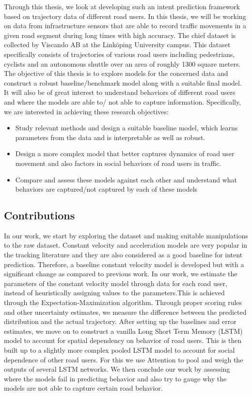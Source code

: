 \documentclass{article}
\begin{document}
Through this thesis, we look at developing such an intent prediction framework based on trajectory data of different road users. In this thesis, we will be working on data from infrastructure sensors that are able to record traffic movements in a given road segment during long times with high accuracy. The chief dataset is collected by Viscando AB at the Linköping University campus. This dataset specifically consists of trajectories of various road users including pedestrians, cyclists and an autonomous shuttle over an area of roughly 1300 square meters. The objective of this thesis is to explore models for the concerned data and construct a robust baseline/benchmark model along with a suitable final model. It will also be of great interest to understand behaviors of different road users and where the models are able to/ not able to capture information. Specifically, we are interested in achieving these research objectives:
\begin{itemize}
    \item Study relevant methods and design a suitable baseline model, which learns parameters from the data and is interpretable as well as robust. 
    \item Design a more complex model that better captures dynamics of road user movement and also factors in social behaviors of road users in traffic. 
    \item Compare and assess these models against each other and understand what behaviors are captured/not captured by each of these models
\end{itemize}


\subsection{Contributions}
In our work, we start by exploring the dataset and making suitable manipulations to the raw dataset. Constant velocity\cite{cvmodel} and acceleration models are very popular in the tracking literature and they are also considered as a good baseline for intent prediction. Therefore, a baseline constant velocity model is developed but with a significant change as compared to previous work. In our work, we estimate the parameters of the constant velocity model through data for each road user, instead of heuristically assigning values to the parameters.This is achieved through the Expectation-Maximization algorithm\cite{emalgorithm}. Through proper scoring rules \cite{scoring} and other uncertainty estimates, we  measure the difference between the predicted distribution and the actual trajectory.  After setting up the baselines and error estimates, we move on to construct a vanilla Long Short Term Memory (LSTM) model to account for spatial dependency on behavior of road users. This is then built up to a slightly more complex pooled LSTM model to account for social dependence of other road users. For this we use Attention to pool and weigh the outputs of several LSTM networks. We then conclude our work by assessing where the models fail in predicting behavior and also try to gauge why the models are not able to capture certain road behavior. 
\end{document}
